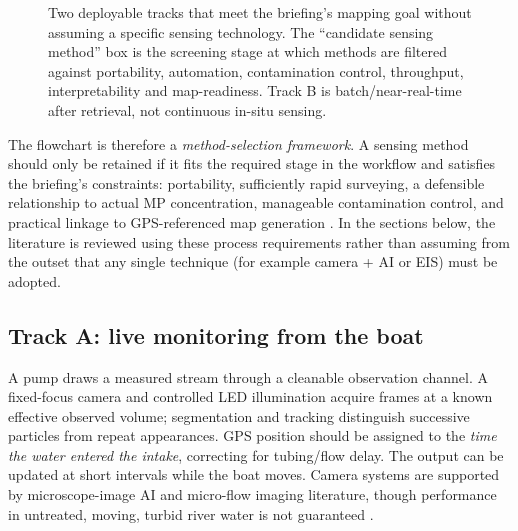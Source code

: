 \documentclass[10pt,a4paper]{article}
\begin{document}
\begin{figure}[H]
\caption{Two deployable tracks that meet the briefing's mapping goal without assuming a specific sensing technology. The ``candidate sensing method'' box is the screening stage at which methods are filtered against portability, automation, contamination control, throughput, interpretability and map-readiness. Track B is batch/near-real-time after retrieval, not continuous in-situ sensing.}\label{fig:tracks}
\end{figure}

The flowchart is therefore a \emph{method-selection framework}. A sensing method should only be retained if it fits the required stage in the workflow and satisfies the briefing's constraints: portability, sufficiently rapid surveying, a defensible relationship to actual MP concentration, manageable contamination control, and practical linkage to GPS-referenced map generation \cite{ProjectBrief2026}. In the sections below, the literature is reviewed using these process requirements rather than assuming from the outset that any single technique (for example camera + AI or EIS) must be adopted.

\subsection{Track A: live monitoring from the boat}
A pump draws a measured stream through a cleanable observation channel. A fixed-focus camera and controlled LED illumination acquire frames at a known effective observed volume; segmentation and tracking distinguish successive particles from repeat appearances. GPS position should be assigned to the \emph{time the water entered the intake}, correcting for tubing/flow delay. The output can be updated at short intervals while the boat moves. Camera systems are supported by microscope-image AI and micro-flow imaging literature, though performance in untreated, moving, turbid river water is not guaranteed \cite{Lee2022,Microflow2023,UrbanCNN2024}.
\end{document}
